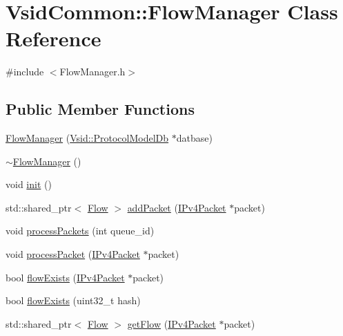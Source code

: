 \hypertarget{class_vsid_common_1_1_flow_manager}{\section{Vsid\-Common\-:\-:Flow\-Manager Class Reference}
\label{class_vsid_common_1_1_flow_manager}
}


{\ttfamily \#include $<$Flow\-Manager.\-h$>$}

\subsection*{Public Member Functions}
\begin{DoxyCompactItemize}
\item 
\hyperlink{class_vsid_common_1_1_flow_manager_a3bfb8315f670eec223fc6b59a33ca6a3}{Flow\-Manager} (\hyperlink{class_vsid_1_1_protocol_model_db}{Vsid\-::\-Protocol\-Model\-Db} $\ast$datbase)
\item 
\hyperlink{class_vsid_common_1_1_flow_manager_a1d0b2e0917fd7f3f0af018bfcd1e2361}{$\sim$\-Flow\-Manager} ()
\item 
void \hyperlink{class_vsid_common_1_1_flow_manager_a49fc9f26f20cb8b963dcf28a704f5861}{init} ()
\item 
std\-::shared\-\_\-ptr$<$ \hyperlink{class_vsid_common_1_1_flow}{Flow} $>$ \hyperlink{class_vsid_common_1_1_flow_manager_a9c840fe2a6650079a3b90ba2d65f1e7e}{add\-Packet} (\hyperlink{class_vsid_common_1_1_i_pv4_packet}{I\-Pv4\-Packet} $\ast$packet)
\item 
void \hyperlink{class_vsid_common_1_1_flow_manager_a73e959f27b2b196694b94cb73b09143d}{process\-Packets} (int queue\-\_\-id)
\item 
void \hyperlink{class_vsid_common_1_1_flow_manager_a1771b987b5c030b6561713781fe90587}{process\-Packet} (\hyperlink{class_vsid_common_1_1_i_pv4_packet}{I\-Pv4\-Packet} $\ast$packet)
\item 
bool \hyperlink{class_vsid_common_1_1_flow_manager_a2f8f9df4a426385d52d4390f45b0492e}{flow\-Exists} (\hyperlink{class_vsid_common_1_1_i_pv4_packet}{I\-Pv4\-Packet} $\ast$packet)
\item 
bool \hyperlink{class_vsid_common_1_1_flow_manager_aa6e102536a355fe7d4c4b7d068b21edb}{flow\-Exists} (uint32\-\_\-t hash)
\item 
std\-::shared\-\_\-ptr$<$ \hyperlink{class_vsid_common_1_1_flow}{Flow} $>$ \hyperlink{class_vsid_common_1_1_flow_manager_ad8e2576a43951a72d71b5cb9827e80e3}{get\-Flow} (\hyperlink{class_vsid_common_1_1_i_pv4_packet}{I\-Pv4\-Packet} $\ast$packet)

\end{DoxyCompactItemize}
